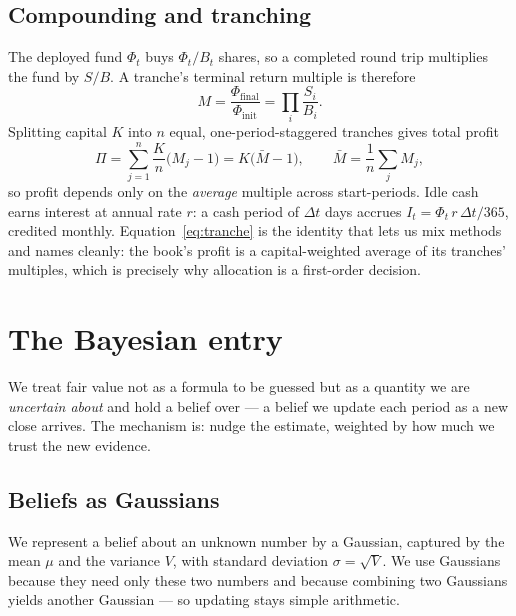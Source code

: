 \documentclass[11pt]{article}
\begin{document}
\subsection{Compounding and tranching}
The deployed fund $\Phi_t$ buys $\Phi_t/B_t$ shares, so a completed round trip multiplies the
fund by $S/B$. A tranche's terminal return multiple is therefore
\begin{equation}
M=\frac{\Phi_{\text{final}}}{\Phi_{\text{init}}}=\prod_i \frac{S_i}{B_i}.
\end{equation}
Splitting capital $K$ into $n$ equal, one-period-staggered tranches gives total profit
\begin{equation}\label{eq:tranche}
\Pi=\sum_{j=1}^{n}\frac{K}{n}\bigl(M_j-1\bigr)=K\bigl(\bar M-1\bigr),
\qquad \bar M=\frac1n\sum_j M_j,
\end{equation}
so profit depends only on the \emph{average} multiple across start-periods. Idle cash earns
interest at annual rate $r$: a cash period of $\Delta t$ days accrues
$I_t=\Phi_t\,r\,\Delta t/365$, credited monthly. Equation~\eqref{eq:tranche} is the identity that
lets us mix methods and names cleanly: the book's profit is a capital-weighted average of its
tranches' multiples, which is precisely why allocation is a first-order decision.

\section{The Bayesian entry}

We treat fair value not as a formula to be guessed but as a quantity we are \emph{uncertain
about} and hold a belief over --- a belief we update each period as a new close arrives. The
mechanism is: nudge the estimate, weighted by how much we trust the new evidence.

\subsection{Beliefs as Gaussians}
We represent a belief about an unknown number by a Gaussian, captured by the mean $\mu$ and the
variance $V$, with standard deviation $\sigma=\sqrt V$. We use Gaussians because they need only
these two numbers and because combining two Gaussians yields another Gaussian --- so updating
stays simple arithmetic.
\end{document}
